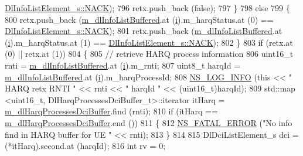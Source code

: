 \begin{DoxyCode}
      \hyperlink{structns3_1_1DlInfoListElement__s_a3e55b89f756b7bd8909c8116a202a17aaf90e76e67c86729b4ee21927b7fb1770}{DlInfoListElement\_s::NACK});
796           retx.push\_back (\textcolor{keyword}{false});
797         \}
798       \textcolor{keywordflow}{else}
799         \{
800           retx.push\_back (\hyperlink{classns3_1_1FdBetFfMacScheduler_ae987d949dcc264154314730346f4a7a8}{m\_dlInfoListBuffered}.at (\hyperlink{bernuolliDistribution_8m_a6f6ccfcf58b31cb6412107d9d5281426}{i}).m\_harqStatus.at (0) == 
      \hyperlink{structns3_1_1DlInfoListElement__s_a3e55b89f756b7bd8909c8116a202a17aaf90e76e67c86729b4ee21927b7fb1770}{DlInfoListElement\_s::NACK});
801           retx.push\_back (\hyperlink{classns3_1_1FdBetFfMacScheduler_ae987d949dcc264154314730346f4a7a8}{m\_dlInfoListBuffered}.at (\hyperlink{bernuolliDistribution_8m_a6f6ccfcf58b31cb6412107d9d5281426}{i}).m\_harqStatus.at (1) == 
      \hyperlink{structns3_1_1DlInfoListElement__s_a3e55b89f756b7bd8909c8116a202a17aaf90e76e67c86729b4ee21927b7fb1770}{DlInfoListElement\_s::NACK});
802         \}
803       \textcolor{keywordflow}{if} (retx.at (0) || retx.at (1))
804         \{
805           \textcolor{comment}{// retrieve HARQ process information}
806           uint16\_t rnti = \hyperlink{classns3_1_1FdBetFfMacScheduler_ae987d949dcc264154314730346f4a7a8}{m\_dlInfoListBuffered}.at (\hyperlink{bernuolliDistribution_8m_a6f6ccfcf58b31cb6412107d9d5281426}{i}).m\_rnti;
807           uint8\_t harqId = \hyperlink{classns3_1_1FdBetFfMacScheduler_ae987d949dcc264154314730346f4a7a8}{m\_dlInfoListBuffered}.at (\hyperlink{bernuolliDistribution_8m_a6f6ccfcf58b31cb6412107d9d5281426}{i}).m\_harqProcessId;
808           \hyperlink{group__logging_gafbd73ee2cf9f26b319f49086d8e860fb}{NS\_LOG\_INFO} (\textcolor{keyword}{this} << \textcolor{stringliteral}{" HARQ retx RNTI "} << rnti << \textcolor{stringliteral}{" harqId "} << (uint16\_t)harqId);
809           std::map <uint16\_t, DlHarqProcessesDciBuffer\_t>::iterator itHarq = 
      \hyperlink{classns3_1_1FdBetFfMacScheduler_af37ecddc35da4f5a44cc0c50b08a4a96}{m\_dlHarqProcessesDciBuffer}.find (rnti);
810           \textcolor{keywordflow}{if} (itHarq == \hyperlink{classns3_1_1FdBetFfMacScheduler_af37ecddc35da4f5a44cc0c50b08a4a96}{m\_dlHarqProcessesDciBuffer}.end ())
811             \{
812               \hyperlink{group__fatal_ga5131d5e3f75d7d4cbfd706ac456fdc85}{NS\_FATAL\_ERROR} (\textcolor{stringliteral}{"No info find in HARQ buffer for UE "} << rnti);
813             \}
814 
815           DlDciListElement\_s dci = (*itHarq).second.at (harqId);
816           \textcolor{keywordtype}{int} rv = 0;

\end{DoxyCode}
